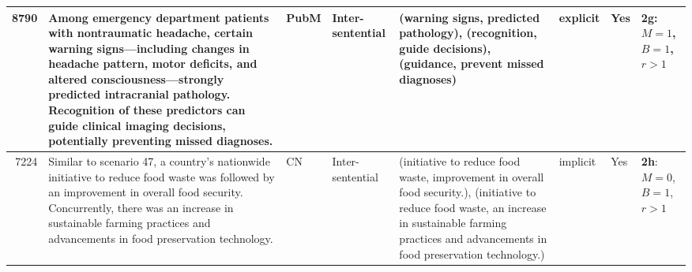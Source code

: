 \documentclass[conference]{IEEEtran}
\begin{document}
\begin{table}[t]
\begin{tabular}{r |p{5cm}| p{1cm} |p{1.5cm}| p{4cm} |p{1.5cm}| p{1.2cm}| p{1.2cm}|}
    8790 & Among emergency department patients with nontraumatic headache, certain warning signs---including changes in headache pattern, motor deficits, and altered consciousness---strongly predicted intracranial pathology. Recognition of these predictors can guide clinical imaging decisions, potentially preventing missed diagnoses. & PubM & Inter-sentential & (warning signs, predicted pathology), (recognition, guide decisions), (guidance, prevent missed diagnoses) & explicit & Yes & \textbf{2g}: $M=1$, $B=1$, $r>1$ \\ \hline
    7224 & Similar to scenario 47, a country's nationwide initiative to reduce food waste was followed by an improvement in overall food security. Concurrently, there was an increase in sustainable farming practices and advancements in food preservation technology. & CN & Inter-sentential & (initiative to reduce food waste, improvement in overall food security.), (initiative to reduce food waste, an increase in sustainable farming practices and advancements in food preservation technology.) & implicit & Yes & \textbf{2h}: $M=0$, $B=1$, $r>1$ \\ 
    \bottomrule
  \end{tabular}
\end{table}
\end{document}
